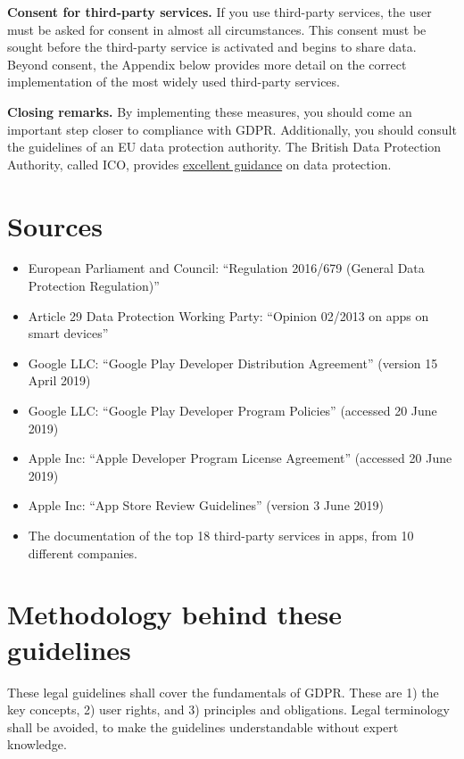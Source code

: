\documentclass[
]{book}
\providecommand{\tightlist}{%
  \setlength{\itemsep}{0pt}\setlength{\parskip}{0pt}}
\begin{document}
\textbf{Consent for third-party services.} If you use third-party services, the user must be asked for consent in almost all circumstances. This consent must be sought before the third-party service is activated and begins to share data. Beyond consent, the Appendix below provides more detail on the correct implementation of the most widely used third-party services.

\textbf{Closing remarks.} By implementing these measures, you should come an important step closer to compliance with GDPR. Additionally, you should consult the guidelines of an EU data protection authority. The British Data Protection Authority, called ICO, provides \href{https://ico.org.uk/for-organisations/}{excellent guidance} on data protection.

\hypertarget{sources}{%
\section{Sources}\label{sources}}

\begin{itemize}
\tightlist
\item
  European Parliament and Council: ``Regulation 2016/679 (General Data Protection Regulation)''
\item
  Article 29 Data Protection Working Party: ``Opinion 02/2013 on apps on smart devices''
\item
  Google LLC: ``Google Play Developer Distribution Agreement'' (version 15 April 2019)
\item
  Google LLC: ``Google Play Developer Program Policies'' (accessed 20 June 2019)
\item
  Apple Inc: ``Apple Developer Program License Agreement'' (accessed 20 June 2019)
\item
  Apple Inc: ``App Store Review Guidelines'' (version 3 June 2019)
\item
  The documentation of the top 18 third-party services in apps, from 10 different companies.
\end{itemize}

\hypertarget{methodology-behind-these-guidelines}{%
\section{Methodology behind these guidelines}\label{methodology-behind-these-guidelines}}

These legal guidelines shall cover the fundamentals of GDPR. These are 1) the key concepts, 2) user rights, and 3) principles and obligations. Legal terminology shall be avoided, to make the guidelines understandable without expert knowledge.
\end{document}
